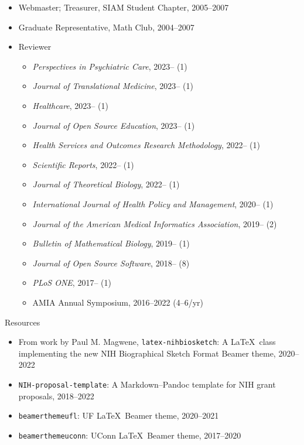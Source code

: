 \documentclass[10pt,a4paper]{article}
\begin{document}
\begin{itemize}[label=$\circ$,nolistsep]
\item
Webmaster; Treasurer, SIAM Student Chapter, 2005--2007
\item
Graduate Representative, Math Club, 2004--2007
\item
Reviewer
\begin{itemize}[label=$\circ$,nolistsep]
\item
{\itshape Perspectives in Psychiatric Care}, 2023-- (1)
\item
{\itshape Journal of Translational Medicine}, 2023-- (1)
\item
{\itshape Healthcare}, 2023-- (1)
\item
{\itshape Journal of Open Source Education}, 2023-- (1)
\item
{\itshape Health Services and Outcomes Research Methodology}, 2022-- (1)
\item
{\itshape Scientific Reports}, 2022-- (1)
\item
{\itshape Journal of Theoretical Biology}, 2022-- (1)
\item
{\itshape International Journal of Health Policy and Management}, 2020-- (1)
\item
{\itshape Journal of the American Medical Informatics Association}, 2019-- (2)
\item
{\itshape Bulletin of Mathematical Biology}, 2019-- (1)
\item
{\itshape Journal of Open Source Software}, 2018-- (8)
\item
{\itshape PLoS ONE}, 2017-- (1)
\item
AMIA Annual Symposium, 2016--2022 (4--6/yr)
\end{itemize}
\end{itemize}

\vspace{.25cm}
{\sc Resources}
\begin{itemize}[label=$\circ$,nolistsep]
\item
From work by Paul M. Magwene, {\tt\small latex-nihbiosketch}: A \LaTeX\ class implementing the new NIH Biographical Sketch Format {\sffamily Beamer} theme, 2020--2022
\item
{\tt\small NIH-proposal-template}: A Markdown--Pandoc template for NIH grant proposals, 2018--2022
\item
{\tt\small beamerthemeufl}: UF \LaTeX\ {\sffamily Beamer} theme, 2020--2021
\item
{\tt\small beamerthemeuconn}: UConn \LaTeX\ {\sffamily Beamer} theme, 2017--2020
\end{itemize}
\end{document}
